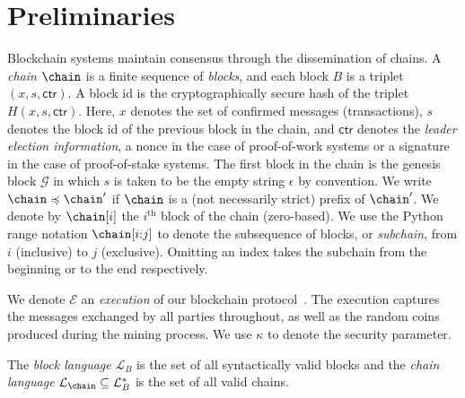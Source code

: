 \section{Preliminaries}

Blockchain systems maintain consensus through the dissemination of chains.
A \emph{chain} $\chain$ is a finite sequence of \emph{blocks}, and each
block $B$ is a triplet $(x, s, \textsf{ctr})$. A block id is the cryptographically
secure hash of the triplet $H(x, s, \textsf{ctr})$. Here, $x$ denotes the set of
confirmed messages (transactions), $s$ denotes the block id of the previous
block in the chain, and $\textsf{ctr}$ denotes the \emph{leader election information},
a nonce in the case of proof-of-work systems or a signature in the case of proof-of-stake
systems. The first block in the chain is the genesis block $\mathcal{G}$ in which $s$
is taken to be the empty string $\epsilon$ by convention. We write
$\chain \preccurlyeq \chain'$ if $\chain$ is a (not necessarily strict) prefix of $\chain'$.
We denote by $\chain[i]$ the $i^\text{th}$ block of the chain (zero-based).
We use the Python range notation $\chain[i{:}j]$ to denote the subsequence of blocks,
or \emph{subchain}, from $i$ (inclusive) to $j$ (exclusive).
Omitting an index takes the subchain from the beginning or to the end
respectively.

We denote $\mathcal{E}$ an \emph{execution} of our blockchain
protocol~\cite{EC:GarKiaLeo15,C:GarKiaLeo17}. The execution captures the messages exchanged
by all parties throughout, as well as the random coins produced during the mining process.
We use $\kappa$ to denote the security parameter.

The \emph{block language} $\mathcal{L}_B$ is the set of all syntactically valid blocks and
the \emph{chain language} $\mathcal{L}_\chain \subseteq \mathcal{L}_B^*$ is the set of all
valid chains.

